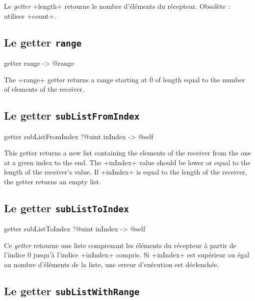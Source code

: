 Le \emph{getter} \ggst+length+ retourne le nombre d'éléments du récepteur. Obsolète : utiliser \ggst+count+.


\subsection{Le getter \texttt{range}}

\begin{galgas3}
getter range -> @range
\end{galgas3}

The \ggst+range+ getter returns a range starting at $0$ of length equal to the number of elements of the receiver.




\subsection{Le getter \texttt{subListFromIndex}}

\begin{galgas3}
getter subListFromIndex ?@uint inIndex -> @self
\end{galgas3}

This getter returns a new list containing the elements of the receiver from the one at a given index to the end. The  \ggst+inIndex+ value should be lower or equal to the length of the receiver's value. If \ggst+inIndex+ is equal to the length of the receiver, the getter returns an empty list.






\subsection{Le getter \texttt{subListToIndex}}

\begin{galgas3}
getter subListToIndex ?@uint inIndex -> @self
\end{galgas3}

Ce \emph{getter} retourne une liste comprenant les éléments du récepteur à partir de l'indice $0$ jusqu'à l'indice \ggst+inIndex+ compris. Si \ggst+inIndex+ est supérieur ou égal au nombre d'éléments de la liste, une erreur d'exécution est déclenchée.




\subsection{Le getter \texttt{subListWithRange}}

